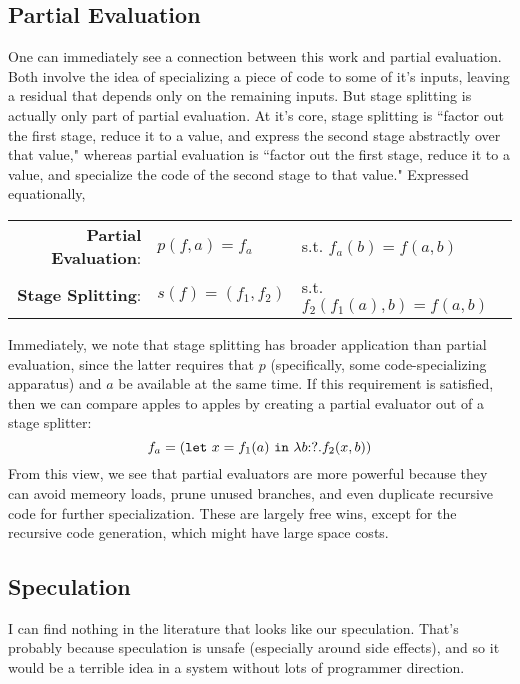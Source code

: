 \documentclass[11pt]{article}
\newcommand {\letin} [3] {{\tt let}~{#1} = {#2}~{\tt in}~{#3}}
\newcommand {\lam} [3] {\lambda{#1}\mathrm{:}{#2}.{#3}}
\begin{document}
\subsection{Partial Evaluation}
One can immediately see a connection between this work and partial evaluation. Both involve the idea of specializing a piece of code to some of it's inputs, leaving a residual that depends only on the remaining inputs.  But stage splitting is actually only part of partial evaluation.  At it's core, stage splitting is ``factor out the first stage, reduce it to a value, and express the second stage abstractly over that value," whereas partial evaluation is ``factor out the first stage, reduce it to a value, and specialize the code of the second stage to that value."  Expressed equationally,
\begin{center}
\begin{tabular}{rll}
{\bf Partial Evaluation}:& $p(f,a)=f_a$ &s.t. $f_a(b) = f(a,b)$ \\
{\bf Stage Splitting}:& $s(f)=(f_1,f_2)$ &s.t. $f_2(f_1(a),b) = f(a,b)$
\end{tabular}
\end{center}
Immediately, we note that stage splitting has broader application than partial evaluation, since the latter requires that $p$ (specifically, some code-specializing apparatus) and $a$ be available at the same time.  If this requirement is satisfied, then we can compare apples to apples by creating a partial evaluator out of a stage splitter:
	\[f_a = (\letin {x}{f_1(a)}{\lam{b}{?}{f_2(x,b)}})\]
From this view, we see that partial evaluators are more powerful because they can avoid memeory loads, prune unused branches, and even duplicate recursive code for further specialization.  These are largely free wins, except for the recursive code generation, which might have large space costs.

\subsection{Speculation}

I can find nothing in the literature that looks like our speculation.  That's probably because speculation is unsafe (especially around side effects), and so it would be a terrible idea in a system without lots of programmer direction.
\end{document}
